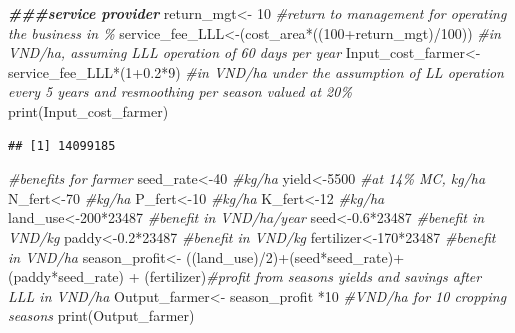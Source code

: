 \documentclass[
]{article}
\newenvironment{Shaded}{\begin{snugshade}}{\end{snugshade}}
\newcommand{\CommentTok}[1]{\textcolor[rgb]{0.56,0.35,0.01}{\textit{#1}}}
\newcommand{\DecValTok}[1]{\textcolor[rgb]{0.00,0.00,0.81}{#1}}
\newcommand{\DocumentationTok}[1]{\textcolor[rgb]{0.56,0.35,0.01}{\textbf{\textit{#1}}}}
\newcommand{\FloatTok}[1]{\textcolor[rgb]{0.00,0.00,0.81}{#1}}
\newcommand{\FunctionTok}[1]{\textcolor[rgb]{0.00,0.00,0.00}{#1}}
\newcommand{\NormalTok}[1]{#1}
\newcommand{\OtherTok}[1]{\textcolor[rgb]{0.56,0.35,0.01}{#1}}
\newcommand{\SpecialCharTok}[1]{\textcolor[rgb]{0.00,0.00,0.00}{#1}}
\begin{document}
\begin{Shaded}
\begin{Highlighting}[]
\DocumentationTok{\#\#\#service provider}
\NormalTok{return\_mgt}\OtherTok{\textless{}{-}} \DecValTok{10} \CommentTok{\#return to management for operating the business in \%}
\NormalTok{service\_fee\_LLL}\OtherTok{\textless{}{-}}\NormalTok{(cost\_area}\SpecialCharTok{*}\NormalTok{((}\DecValTok{100}\SpecialCharTok{+}\NormalTok{return\_mgt)}\SpecialCharTok{/}\DecValTok{100}\NormalTok{))  }\CommentTok{\#in VND/ha, assuming LLL operation of 60 days per year}
\NormalTok{Input\_cost\_farmer}\OtherTok{\textless{}{-}}\NormalTok{service\_fee\_LLL}\SpecialCharTok{*}\NormalTok{(}\DecValTok{1}\FloatTok{+0.2}\SpecialCharTok{*}\DecValTok{9}\NormalTok{) }\CommentTok{\#in VND/ha under the assumption of LL operation every 5 years and resmoothing per season valued at 20\%}
\FunctionTok{print}\NormalTok{(Input\_cost\_farmer)}
\end{Highlighting}
\end{Shaded}

\begin{verbatim}
## [1] 14099185
\end{verbatim}

\begin{Shaded}
\begin{Highlighting}[]
\CommentTok{\#benefits for farmer}
\NormalTok{seed\_rate}\OtherTok{\textless{}{-}}\DecValTok{40} \CommentTok{\#kg/ha}
\NormalTok{yield}\OtherTok{\textless{}{-}}\DecValTok{5500} \CommentTok{\#at 14\% MC, kg/ha}
\NormalTok{N\_fert}\OtherTok{\textless{}{-}}\DecValTok{70} \CommentTok{\#kg/ha}
\NormalTok{P\_fert}\OtherTok{\textless{}{-}}\DecValTok{10} \CommentTok{\#kg/ha}
\NormalTok{K\_fert}\OtherTok{\textless{}{-}}\DecValTok{12} \CommentTok{\#kg/ha}
\NormalTok{land\_use}\OtherTok{\textless{}{-}}\DecValTok{200}\SpecialCharTok{*}\DecValTok{23487} \CommentTok{\#benefit in VND/ha/year}
\NormalTok{seed}\OtherTok{\textless{}{-}}\FloatTok{0.6}\SpecialCharTok{*}\DecValTok{23487} \CommentTok{\#benefit in VND/kg}
\NormalTok{paddy}\OtherTok{\textless{}{-}}\FloatTok{0.2}\SpecialCharTok{*}\DecValTok{23487} \CommentTok{\#benefit in VND/kg}
\NormalTok{fertilizer}\OtherTok{\textless{}{-}}\DecValTok{170}\SpecialCharTok{*}\DecValTok{23487} \CommentTok{\#benefit in VND/ha}
\NormalTok{season\_profit}\OtherTok{\textless{}{-}}\NormalTok{ ((land\_use)}\SpecialCharTok{/}\DecValTok{2}\NormalTok{)}\SpecialCharTok{+}\NormalTok{(seed}\SpecialCharTok{*}\NormalTok{seed\_rate)}\SpecialCharTok{+}\NormalTok{ (paddy}\SpecialCharTok{*}\NormalTok{seed\_rate) }\SpecialCharTok{+}\NormalTok{ (fertilizer)}\CommentTok{\#profit from season\textquotesingle{}s yields and savings after LLL in VND/ha}
\NormalTok{Output\_farmer}\OtherTok{\textless{}{-}}\NormalTok{ season\_profit }\SpecialCharTok{*}\DecValTok{10} \CommentTok{\#VND/ha for 10 cropping seasons}
\FunctionTok{print}\NormalTok{(Output\_farmer)}
\end{Highlighting}
\end{Shaded}
\end{document}
